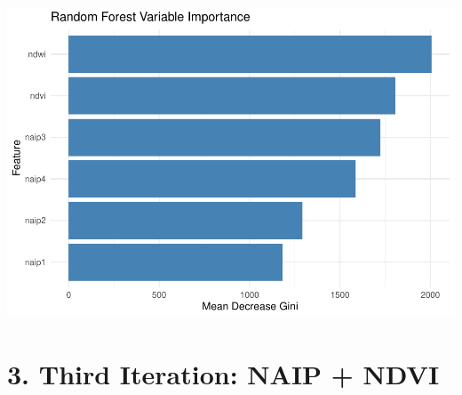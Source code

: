 \documentclass[
]{article}
\begin{document}
\includegraphics{veg_model_files/figure-latex/unnamed-chunk-9-3.pdf}

\section{3. Third Iteration: NAIP +
NDVI}\label{third-iteration-naip-ndvi}
\end{document}
